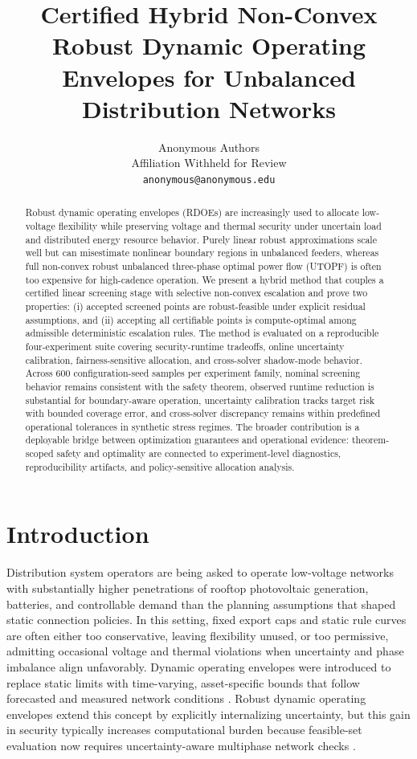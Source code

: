 \documentclass{article} %
\title{Certified Hybrid Non-Convex Robust Dynamic Operating Envelopes for Unbalanced Distribution Networks}
\author{Anonymous Authors \\
Affiliation Withheld for Review \\
\texttt{anonymous@anonymous.edu}}
\begin{document}
\maketitle

\begin{abstract}
Robust dynamic operating envelopes (RDOEs) are increasingly used to allocate low-voltage flexibility while preserving voltage and thermal security under uncertain load and distributed energy resource behavior. Purely linear robust approximations scale well but can misestimate nonlinear boundary regions in unbalanced feeders, whereas full non-convex robust unbalanced three-phase optimal power flow (UTOPF) is often too expensive for high-cadence operation. We present a hybrid method that couples a certified linear screening stage with selective non-convex escalation and prove two properties: (i) accepted screened points are robust-feasible under explicit residual assumptions, and (ii) accepting all certifiable points is compute-optimal among admissible deterministic escalation rules. The method is evaluated on a reproducible four-experiment suite covering security-runtime tradeoffs, online uncertainty calibration, fairness-sensitive allocation, and cross-solver shadow-mode behavior. Across 600 configuration-seed samples per experiment family, nominal screening behavior remains consistent with the safety theorem, observed runtime reduction is substantial for boundary-aware operation, uncertainty calibration tracks target risk with bounded coverage error, and cross-solver discrepancy remains within predefined operational tolerances in synthetic stress regimes. The broader contribution is a deployable bridge between optimization guarantees and operational evidence: theorem-scoped safety and optimality are connected to experiment-level diagnostics, reproducibility artifacts, and policy-sensitive allocation analysis.
\end{abstract}

\section{Introduction}
Distribution system operators are being asked to operate low-voltage networks with substantially higher penetrations of rooftop photovoltaic generation, batteries, and controllable demand than the planning assumptions that shaped static connection policies. In this setting, fixed export caps and static rule curves are often either too conservative, leaving flexibility unused, or too permissive, admitting occasional voltage and thermal violations when uncertainty and phase imbalance align unfavorably. Dynamic operating envelopes were introduced to replace static limits with time-varying, asset-specific bounds that follow forecasted and measured network conditions \citep{KA15,KA35}. Robust dynamic operating envelopes extend this concept by explicitly internalizing uncertainty, but this gain in security typically increases computational burden because feasible-set evaluation now requires uncertainty-aware multiphase network checks \citep{KA01,KA03,KA04}.
\end{document}
